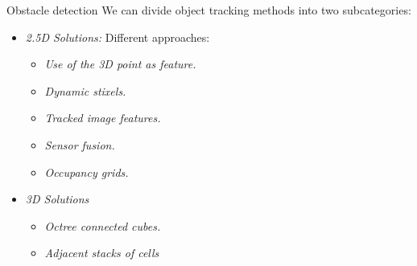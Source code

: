   \begin{frame}{Obstacle detection}
    We can divide object tracking methods into two subcategories:
    \begin{itemize}
      \item \emph{2.5D Solutions:} Different approaches:
      \begin{itemize}
	\item \emph{Use of the 3D point as feature.} \cite{franke20056d}
	\item \emph{Dynamic stixels.} \cite{badino2009stixel, pfeiffer2011towards, pfeiffer2013exploiting, benenson2011stixels, benenson2012pedestrian, benenson2012fast}
	\item \emph{Tracked image features.} \cite{barth2009estimating}
	\item \emph{Sensor fusion.} \cite{wu2009collision}
	\item \emph{Occupancy grids.} \cite{danescu2012particle}
      \end{itemize} 
      \item \emph{3D Solutions}
      \begin{itemize}
	\item \emph{Octree connected cubes.} \cite{broggi2013}
	\item \emph{Adjacent stacks of cells} \cite{Moravec96robotspatial}
      \end{itemize}
    \end{itemize}
    

\end{frame}
